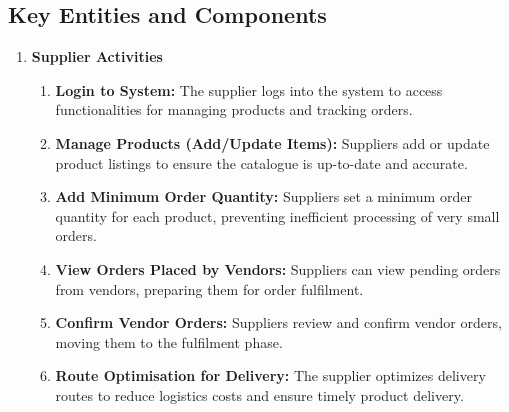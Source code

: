 \subsection{Key Entities and Components}
\begin{enumerate}
    \item \textbf{Supplier Activities}
          \begin{enumerate}
              \item \textbf{Login to System:} The supplier logs into the system to access functionalities for managing products and tracking orders.
              \item \textbf{Manage Products (Add/Update Items):} Suppliers add or update product listings to ensure the catalogue is up-to-date and accurate.
              \item \textbf{Add Minimum Order Quantity:} Suppliers set a minimum order quantity for each product, preventing inefficient processing of very small orders.
              \item \textbf{View Orders Placed by Vendors:} Suppliers can view pending orders from vendors, preparing them for order fulfilment.
              \item \textbf{Confirm Vendor Orders:} Suppliers review and confirm vendor orders, moving them to the fulfilment phase.
              \item \textbf{Route Optimisation for Delivery:} The supplier optimizes delivery routes to reduce logistics costs and ensure timely product delivery.
          \end{enumerate}


\end{enumerate}
